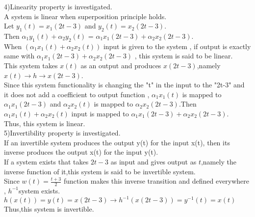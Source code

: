 \documentclass[10pt,a4paper, margin=1in]{article}
\begin{document}
\begin{enumerate}
\begin{enumerate}
 	4)Linearity property is investigated.\\
 	
 	A system is linear when superposition principle holds.\\
 	
 	Let $y_1(t) = x_1(2t-3)$ and  $y_2(t) = x_2(2t-3)$.\\
 	
 	Then $\alpha_1 y_1(t) + \alpha_2 y_2(t)$ = $\alpha_1 x_1(2t-3) + \alpha_2 x_2(2t-3)$.\\
 	
 	When $(\alpha_1 x_1(t) + \alpha_2 x_2(t))$ input is given to the system , if output is exactly same with $\alpha_1 x_1(2t-3) + \alpha_2 x_2(2t-3)$ , this system is said to be linear.\\
 	
 	This system takes $x(t)$ as an output and produces $x(2t-3)$,namely $x(t) \rightarrow h \rightarrow x(2t-3)$.\\
 	Since this system functionality is changing the "t" in the input to the "2t-3" and it does not add a coefficient to output function , $\alpha_1 x_1(t)$ is mapped to $\alpha_1 x_1(2t-3) $ and $\alpha_2 x_2(t)$ is mapped to $\alpha_2 x_2(2t-3)$.Then $\alpha_1 x_1(t) + \alpha_2 x_2(t)$ input is mapped to $\alpha_1 x_1(2t-3) + \alpha_2 x_2(2t-3)$.\\
 	
 	Thus, this system is linear.\\
 	
 	5)Invertibility property is investigated.\\
 	
 	If an invertible system produces the output y(t) for the input x(t), then its inverse produces the output x(t) for the input y(t).\\
	
	If a system exists that takes $2t-3$ as input and gives output as $t$,namely the inverse function of it,this system is said to be invertible system.\\
	
	Since $w(t) = \frac{t+3}{2}$ function makes this inverse transition and defined everywhere , $h^{-1} $system exists.\\
	
	$h(x(t))=y(t)=x(2t-3) \rightarrow h^{-1}(x(2t-3))=y^{-1}(t)=x(t)$\\
	
	Thus,this system is invertible.\\
 	

\end{enumerate}
\end{enumerate}
\end{document}
